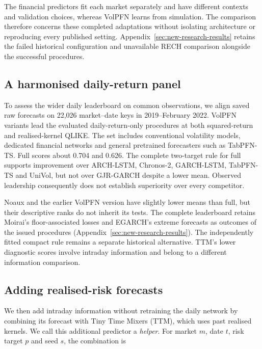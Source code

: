 

The financial predictors fit each market separately and have different contexts and validation choices, whereas VolPFN learns from simulation. The comparison therefore concerns these completed adaptations without isolating architecture or reproducing every published setting. Appendix~\ref{sec:new-research-results} retains the failed historical configuration and unavailable RECH comparison alongside the successful procedures.

\subsection{A harmonised daily-return panel}
\label{sec:new-harmonised-daily}

To assess the wider daily leaderboard on common observations, we align saved raw forecasts on 22,026 market--date keys in 2019--February 2022. VolPFN variants lead the evaluated daily-return-only procedures at both squared-return and realised-kernel QLIKE. The set includes conventional volatility models, dedicated financial networks and general pretrained forecasters such as TabPFN-TS. Full scores about 0.704 and 0.626. The complete two-target rule for full supports improvement over ARCH-LSTM, Chronos-2, GARCH-LSTM, TabPFN-TS and UniVol, but not over GJR-GARCH despite a lower mean. Observed leadership consequently does not establish superiority over every competitor.

Noaux and the earlier VolPFN version have slightly lower means than full, but their descriptive ranks do not inherit its tests. The complete leaderboard retains Moirai's floor-associated losses and EGARCH's extreme forecasts as outcomes of the issued procedures (Appendix~\ref{sec:new-research-results}). The independently fitted compact rule remains a separate historical alternative. TTM's lower diagnostic scores involve intraday information and belong to a different information comparison.

\subsection{Adding realised-risk forecasts}
\label{sec:new-intraday-comparison}

We then add intraday information without retraining the daily network by combining its forecast with Tiny Time Mixers (TTM), which uses past realised kernels. We call this additional predictor a \emph{helper}. For market $m$, date $t$, risk target $p$ and seed $s$, the combination is

